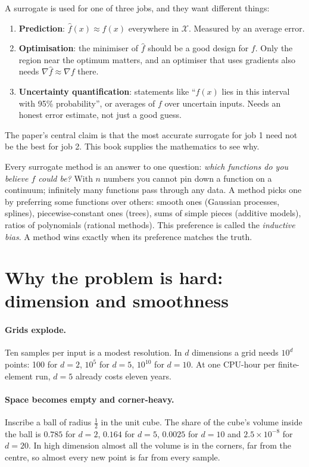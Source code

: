 A surrogate is used for one of three jobs, and they want different things:
\begin{enumerate}[nosep]
  \item \textbf{Prediction}: $\hat f(x) \approx f(x)$ everywhere in $\mathcal{X}$. Measured by an average error.
  \item \textbf{Optimisation}: the minimiser of $\hat f$ should be a good design for $f$. Only the region near the
        optimum matters, and an optimiser that uses gradients also needs $\nabla \hat f \approx \nabla f$ there.
  \item \textbf{Uncertainty quantification}: statements like ``$f(x)$ lies in this interval with 95\% probability'',
        or averages of $f$ over uncertain inputs. Needs an honest error estimate, not just a good guess.
\end{enumerate}
The paper's central claim is that the most accurate surrogate for job 1 need not be the best for job 2. This book
supplies the mathematics to see why.

\begin{intuition}
Every surrogate method is an answer to one question: \emph{which functions do you believe $f$ could be?} With $n$
numbers you cannot pin down a function on a continuum; infinitely many functions pass through any data. A method
picks one by preferring some functions over others: smooth ones (Gaussian processes, splines), piecewise-constant
ones (trees), sums of simple pieces (additive models), ratios of polynomials (rational methods). This preference is
called the \emph{inductive bias}. A method wins exactly when its preference matches the truth.
\end{intuition}

\section{Why the problem is hard: dimension and smoothness}
\label{sec:curse}

\paragraph{Grids explode.} Ten samples per input is a modest resolution. In $d$ dimensions a grid needs $10^d$
points: 100 for $d = 2$, $10^5$ for $d = 5$, $10^{10}$ for $d = 10$. At one CPU-hour per finite-element run, $d = 5$
already costs eleven years.

\paragraph{Space becomes empty and corner-heavy.} Inscribe a ball of radius $\tfrac12$ in the unit cube. The share of
the cube's volume inside the ball is $0.785$ for $d = 2$, $0.164$ for $d = 5$, $0.0025$ for $d = 10$ and
$2.5\times 10^{-8}$ for $d = 20$. In high dimension almost all the volume is in the corners, far from the centre, so
almost every new point is far from every sample.

